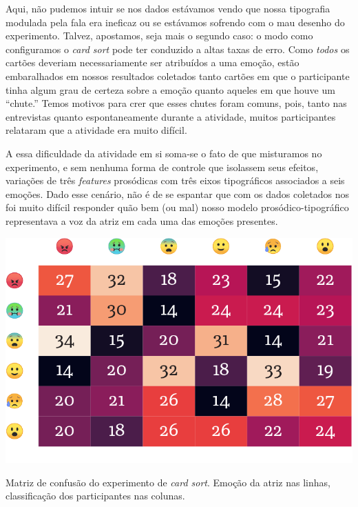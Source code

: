\documentclass[a4paper]{tufte-handout}
\begin{document}
Aqui, não pudemos intuir se nos dados estávamos vendo que nossa tipografia modulada pela fala era ineficaz ou se estávamos sofrendo com o mau desenho do experimento. Talvez, apostamos, seja mais o segundo caso: o modo como configuramos o \textit{card sort} pode ter conduzido a altas taxas de erro. Como \textit{todos} os cartões deveriam necessariamente ser atribuídos a uma emoção, estão embaralhados em nossos resultados coletados tanto cartões em que o participante tinha algum grau de certeza sobre a emoção quanto aqueles em que houve um ``chute.'' Temos motivos para crer que esses chutes foram comuns, pois, tanto nas entrevistas quanto espontaneamente durante a atividade, muitos participantes relataram que a atividade era muito difícil.

A essa dificuldade da atividade em si soma-se o fato de que misturamos no experimento, e sem nenhuma forma de controle que isolassem seus efeitos, variações de três \textit{features} prosódicas com três eixos tipográficos associados a seis emoções. Dado esse cenário, não é de se espantar que com os dados coletados nos foi muito difícil responder quão bem (ou mal) nosso modelo prosódico-tipográfico representava a voz da atriz em cada uma das emoções presentes. 


\begin{marginfigure}
  \includegraphics{imgs/confusion-emoji2.png}
  \caption{Matriz de confusão do experimento de \textit{card sort}. Emoção da atriz nas linhas, classificação dos participantes nas colunas.}
  \label{matriz_confusao}
\end{marginfigure}
\end{document}
